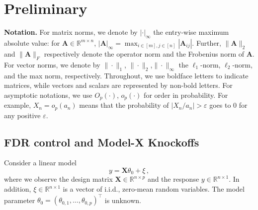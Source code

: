 \documentclass[11pt]{article}
\newcommand{\bX}{\boldsymbol{X}}
\newcommand{\bA}{\boldsymbol{A}}
\newcommand{\mbR}{\mathbb{R}}
\begin{document}
\section{Preliminary}\label{sec:prelim}
\textbf{Notation.} For matrix norms, we denote by $|\cdot|_\infty$ the entry-wise maximum absolute value: for $\bA\in\mbR^{m\times n}$, $|\bA|_\infty = \max_{i\in[m],j\in[n]}|\bA_{ij}|$. Further, $\|\bA\|_2$ and $\|\bA\|_F$ respectively denote the operator norm and the Frobenius norm of $\bA$. For vector norms, we denote by $\|\cdot\|_1$, $\|\cdot\|_2$,$\|\cdot\|_\infty$ the $\ell_1$-norm, $\ell_2$-norm, and the max norm, respectively. Throughout, we use boldface letters to indicate matrices, while vectors and scalars are represented by non-bold letters.
For asymptotic notations, we use $O_p(\cdot)$, $o_p(\cdot)$ for order in probability. For example, $X_n=o_p(a_n)$ means that the probability of $|X_n/a_n| > \varepsilon$ goes to 0 for any positive $\varepsilon$.
  
\subsection{FDR control and Model-X Knockoffs}

Consider a linear model
\begin{equation}\label{eq:linear-model}
    y= \bX\theta_0+\xi\,,
\end{equation}
where we observe the design matrix $\bX\in\mbR^{n\times p}$ and the response $ y\in\mbR^{n\times 1}$. In addition, $\xi\in\mbR^{n\times 1}$ is a vector of i.i.d., zero-mean random variables. The model parameter $\theta_0=(\theta_{0,1},\dotsc,\theta_{0,p})^\top$ is unknown. 
\end{document}
